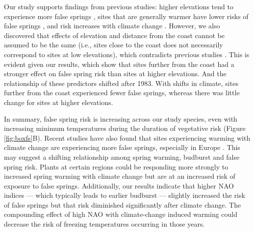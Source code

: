 \documentclass{article}\usepackage[]{graphicx}\usepackage[]{color}
\begin{document}
Our study supports findings from previous studies: higher elevations tend to experience more false springs \citep{Vitasse2018, Vitra2017}, sites that are generally warmer have lower risks of false springs \citep{Wypych2016}, and risk increases with climate change \citep{Liu2018}. However, we also discovered that effects of elevation and distance from the coast cannot be assumed to be the same (i.e., sites close to the coast does not necessarily correspond to sites at low elevations), which contradicts previous studies \citep{Ma2018}. This is evident given our results, which show that sites further from the coast had a stronger effect on false spring risk than sites at higher elevations. And the relationship of these predictors shifted after 1983. With shifts in climate, sites further from the coast experienced fewer false springs, whereas there was little change for sites at higher elevations.
 
In summary, false spring risk is increasing across our study species, even with increasing minimum temperatures during the duration of vegetative risk (Figure \ref{fig:boxfs}B). Recent studies have also found that sites experiencing warming with climate change are experiencing more false springs, especially in Europe \citep{Liu2018}. This may suggest a shifting relationship among spring warming, budburst and false spring risk. Plants at certain regions could be responding more strongly to increased spring warming with climate change but are at an increased risk of exposure to false springs. Additionally, our results indicate that higher NAO indices --- which typically leads to earlier budburst --- slightly increased the risk of false springs but that risk diminished significantly after climate change. The compounding effect of high NAO with climate-change induced warming could decrease the risk of freezing temperatures occurring in those years.%
\end{document}
